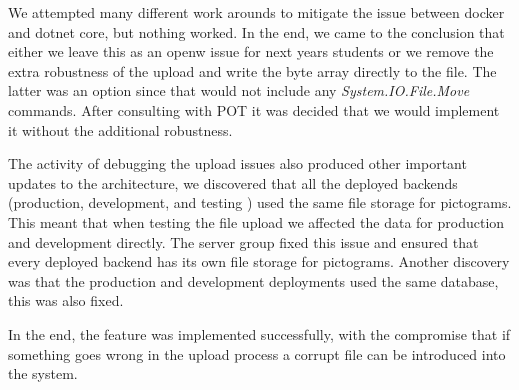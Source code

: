 We attempted many different work arounds to mitigate the issue between docker and dotnet core, but nothing worked. In the end, we came to the conclusion that either we leave this as an openw issue for next years students or we remove the extra robustness of the upload and write the byte array directly to the file. The latter was an option since that would not include any \textit{System.IO.File.Move} commands. After consulting with \gls{POT} it was decided that we would implement it without the additional robustness.

The activity of debugging the upload issues also produced other important updates to the architecture, we discovered that all the  deployed backends (production, development, and testing ) used the same file storage for pictograms. This meant that when testing the file upload we affected the data for production and development directly. The server group fixed this issue and ensured that every deployed backend has its own file storage for pictograms. Another discovery was that the production and development deployments used the same database, this was also fixed.

In the end, the feature was implemented successfully, with the compromise that if something goes wrong in the upload process a corrupt file can be introduced into the system.